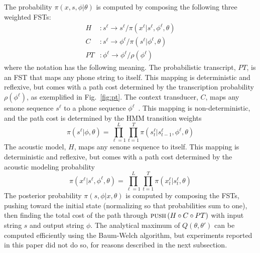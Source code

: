 The probability $\pi(x,s,\phi|\theta)$ is computed by composing the
following three weighted FSTs:
\begin{align}
  H&:s^\ell\rightarrow s^\ell/ \pi(x^\ell|s^\ell,\phi^\ell,\theta)\\
  C&:s^\ell\rightarrow \phi^\ell/ \pi(s^\ell|\phi^\ell,\theta)\\
  PT&:\phi^\ell\rightarrow\phi^\ell/ \rho(\phi^\ell)
\end{align}
where the notation has the following meaning.  The probabilistic
transcript, $PT$, is an FST that maps any phone string
to itself.  This mapping is deterministic
and reflexive, but comes with a path cost determined by the
transcription probability $\rho(\phi^\ell)$, as exemplified in
Fig.~\ref{fig:pt}.  The context transducer, $C$, maps any senone
sequence $s^\ell$ to a phone sequence $\phi^\ell$~\cite{mohri2008speech}.
This mapping is non-deterministic, and the path cost is determined by
the HMM transition weights
\begin{equation}
  \pi(s^\ell|\phi,\theta)=\prod_{\ell=1}^L\prod_{t=1}^T
  \pi(s_t^{\ell}\vert s_{t-1}^{\ell},\phi^\ell,\theta)
\end{equation}
The acoustic model, $H$, maps any senone sequence to
itself.  This mapping is deterministic and reflexive, but comes with a
path cost determined by the acoustic modeling probability
\begin{equation}
  \pi(x^\ell|s^\ell,\phi^\ell,\theta)=\prod_{\ell=1}^L\prod_{t=1}^T
  \pi(x_t^\ell|s_t^\ell,\theta)
\end{equation}
The posterior probability
$\pi(s,\phi|x,\theta)$ is computed by
composing the FSTs, pushing toward the initial state
(normalizing so that probabilities sum to one),
then finding the total cost of the path through
$\textsc{push}\left(H\circ C\circ PT\right)$
with input string $s$ and output string $\phi$.
The analytical maximum of $Q\left(\theta,\theta'\right)$
can be computed efficiently using
the Baum-Welch algorithm, but experiments reported in this
paper did not do so, for reasons described in the next subsection.
